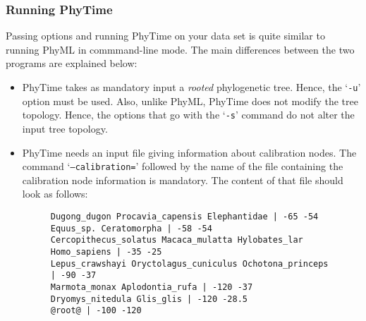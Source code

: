 \documentclass[a4paper,12pt]{article}
\newcommand{\x}[1]{\texttt{#1}}
\begin{document}
\subsubsection{Running  PhyTime} Passing  options and  running  PhyTime on  your data  set is  quite
similar to running  PhyML in commmand-line mode.  The main differences between the  two programs are
explained below:
\begin{itemize}
\item PhyTime takes as mandatory input a {\em rooted} phylogenetic tree.  Hence, the `\x{-u}' option
must be used. Also, unlike PhyML, PhyTime does not modify the tree topology. Hence, the options that
go with the `\x{-s}' command do not alter the input tree topology.
\item  PhyTime  needs  an input  file  giving  information  about  calibration nodes.   The  command
`\x{--calibration=}' followed by the name of  the file containing the calibration node information is
mandatory. The content of that file should look as follows:

\begin{figure}[h]
\begin{small}
\begin{Verbatim}[frame=single, label=Calibration node file, samepage=true, baselinestretch=0.5]
Dugong_dugon Procavia_capensis Elephantidae | -65 -54
Equus_sp. Ceratomorpha | -58 -54
Cercopithecus_solatus Macaca_mulatta Hylobates_lar Homo_sapiens | -35 -25
Lepus_crawshayi Oryctolagus_cuniculus Ochotona_princeps | -90 -37
Marmota_monax Aplodontia_rufa | -120 -37 
Dryomys_nitedula Glis_glis | -120 -28.5
@root@ | -100 -120
\end{Verbatim}
\end{small}
\end{figure}


\end{itemize}
\end{document}
